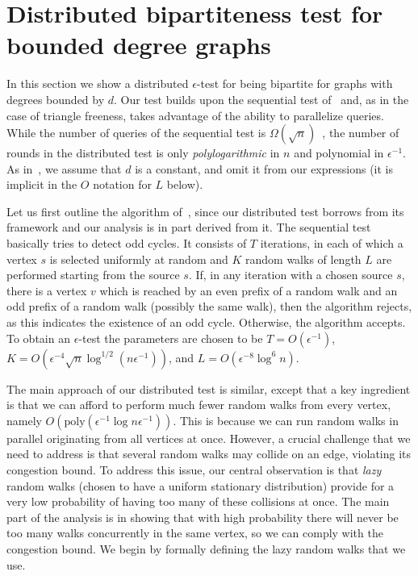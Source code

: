 \documentclass[11pt]{article}
\newcommand{\poly}{\textrm{poly}}
\begin{document}
\section{Distributed bipartiteness test for bounded degree graphs}
\label{sec:bi}
In this section we show a distributed $\epsilon$-test for being bipartite for graphs with degrees bounded by $d$.
Our test builds upon the sequential test of~\cite{GR99} and, as in the case of triangle freeness, takes advantage of the ability to parallelize queries. While the number of queries of the sequential test is $\Omega(\sqrt{n})$~\cite{GoldreichR02}, the number of rounds in the distributed test is only \emph{polylogarithmic} in $n$ and polynomial in $\epsilon^{-1}$. As in~\cite{GR99}, we assume that $d$ is a constant, and omit it from our expressions (it is implicit in the $O$ notation for $L$ below).

Let us first outline the algorithm of~\cite{GR99}, since our distributed test borrows from its framework and our analysis is in part derived from it. The sequential test basically tries to detect odd cycles. It consists of $T$ iterations, in each of which a vertex $s$ is selected uniformly at random and $K$ random walks of length $L$ are performed starting from the source $s$. If, in any iteration with a chosen source $s$, there is a vertex $v$ which is reached by an even prefix of a random walk and an odd prefix of a random walk (possibly the same walk), then the algorithm rejects, as this indicates the existence of an odd cycle. Otherwise, the algorithm accepts.
To obtain an $\epsilon$-test the parameters are chosen to be $T=O(\epsilon^{-1})$, $K=O(\epsilon^{-4}\sqrt{n}\log^{1/2}{(n\epsilon^{-1})})$, and $L=O(\epsilon^{-8}\log^6{n})$.

The main approach of our distributed test is similar, except that a key ingredient is that we can afford to perform much fewer random walks from every vertex, namely $O(\poly{(\epsilon^{-1}\log{n\epsilon^{-1}})})$. This is because we can run random walks in parallel originating from all vertices at once. However, a crucial challenge that we need to address is that several random walks may collide on an edge, violating its congestion bound. To address this issue, our central observation is that \emph{lazy} random walks (chosen to have a uniform stationary distribution) provide for a very low probability of having too many of these collisions at once. The main part of the analysis is in showing that with high probability there will never be too many walks concurrently in the same vertex, so we can comply with the congestion bound. We begin by formally defining the lazy random walks that we use.
\end{document}
